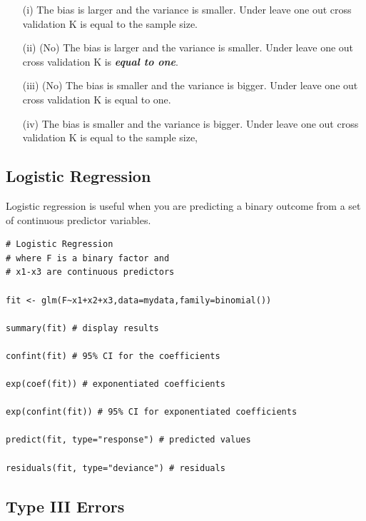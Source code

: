 \documentclass[caret-main.tex]{subfiles}
\begin{document}
\begin{itemize}
\item[(i)]The bias is larger and the variance is smaller. Under leave one out cross validation K is equal to the sample size.			
\item[(ii)] (No) The bias is larger and the variance is smaller. Under leave one out cross validation K is \textbf{\textit{equal to one}}.			
\item[(iii)] (No) The bias is smaller and the variance is bigger. Under leave one out cross validation K is equal to one.
\item[(iv)] The bias is smaller and the variance is bigger. Under leave one out cross validation K is equal to the sample size,
\end{itemize}
\newpage

\subsection*{Logistic Regression}

Logistic regression is useful when you are predicting a binary outcome from a set of continuous predictor variables. 
\begin{framed}
\begin{verbatim}
# Logistic Regression
# where F is a binary factor and 
# x1-x3 are continuous predictors 

fit <- glm(F~x1+x2+x3,data=mydata,family=binomial())

summary(fit) # display results

confint(fit) # 95% CI for the coefficients

exp(coef(fit)) # exponentiated coefficients

exp(confint(fit)) # 95% CI for exponentiated coefficients

predict(fit, type="response") # predicted values

residuals(fit, type="deviance") # residuals

\end{verbatim}
\end{framed}
\newpage
\subsection*{Type III Errors}
\end{document}
